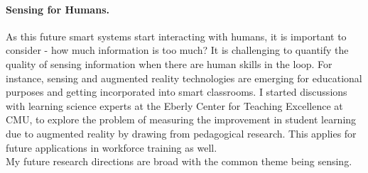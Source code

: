 \documentclass[10pt]{article}
\begin{document}
\paragraph{Sensing for Humans. }
As this future smart systems start interacting with humans, it is important to consider - how much information is too much? It is challenging to quantify the quality of sensing information when there are human skills in the loop. 
For instance, sensing and augmented reality technologies are emerging for educational purposes and getting incorporated into smart classrooms. 
I started discussions with learning science experts at the Eberly Center for Teaching Excellence at CMU, to explore the problem of measuring the improvement in student learning due to augmented reality by drawing from pedagogical research. This applies for future applications in workforce training as well. \\

My future research directions are broad with the common theme being sensing. 








\end{document}

